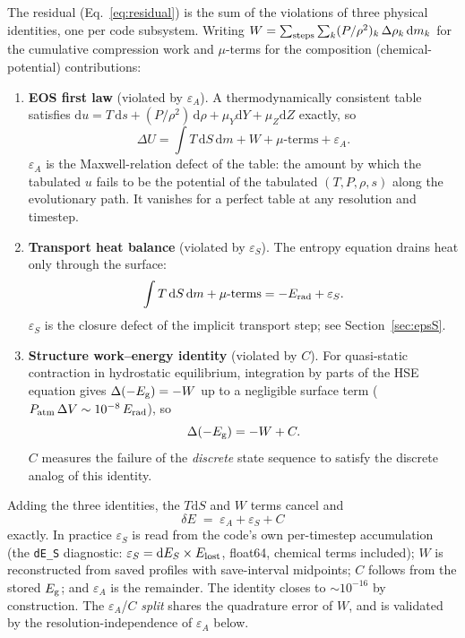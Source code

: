\documentclass{aastex631}
\newcommand{\dd}{\mathrm{d}}
\newcommand{\Erad}{E_{\rm rad}}
\newcommand{\Eg}{E_{\rm g}}
\newcommand{\Elost}{E_{\rm lost}}
\newcommand{\epsA}{\varepsilon_A}
\newcommand{\epsS}{\varepsilon_S}
\newcommand{\dE}{\delta E}
\begin{document}
The residual (Eq.~\ref{eq:residual}) is the sum of the violations of
three physical identities, one per code subsystem.  Writing
$W = \sum_{\rm steps}\sum_k (P/\rho^2)_k\,\Delta\rho_k\,\dd m_k$ for the
cumulative compression work and $\mu$-terms for the composition
(chemical-potential) contributions:

\begin{enumerate}
\item \textbf{EOS first law} (violated by $\epsA$).  A thermodynamically
consistent table satisfies
$\dd u = T\,\dd s + (P/\rho^2)\,\dd\rho + \mu_Y \dd Y + \mu_Z \dd Z$
exactly, so
\begin{equation}
\Delta U = \!\int\!\! T\,\dd S\,\dd m + W + \mu\text{-terms} + \epsA .
\end{equation}
$\epsA$ is the Maxwell-relation defect of the table: the amount by which
the tabulated $u$ fails to be the potential of the tabulated $(T, P,
\rho, s)$ along the evolutionary path.  It vanishes for a perfect table
at any resolution and timestep.

\item \textbf{Transport heat balance} (violated by $\epsS$).  The entropy
equation drains heat only through the surface:
\begin{equation}
\int T\,\dd S\,\dd m + \mu\text{-terms} = -\Erad + \epsS .
\end{equation}
$\epsS$ is the closure defect of the implicit transport step; see
Section~\ref{sec:epsS}.

\item \textbf{Structure work--energy identity} (violated by $C$).  For
quasi-static contraction in hydrostatic equilibrium, integration by parts
of the HSE equation gives $\Delta(-\Eg) = -W$ up to a negligible surface
term ($P_{\rm atm}\,\Delta V \sim 10^{-8}\,\Erad$), so
\begin{equation}
\Delta(-\Eg) = -W + C .
\end{equation}
$C$ measures the failure of the \emph{discrete} state sequence to satisfy
the discrete analog of this identity.
\end{enumerate}

Adding the three identities, the $T\dd S$ and $W$ terms cancel and
\begin{equation}
\boxed{\;\dE \;=\; \epsA + \epsS + C\;}
\label{eq:budget}
\end{equation}
exactly.  In practice $\epsS$ is read from the code's own per-timestep
accumulation (the \texttt{dE\_S} diagnostic:
$\epsS = \mathrm{d}E_S \times \Elost$, float64, chemical terms included);
$W$ is reconstructed from saved profiles with save-interval midpoints;
$C$ follows from the stored $\Eg$; and $\epsA$ is the remainder.  The
identity closes to $\sim$$10^{-16}$ by construction.  The $\epsA$/$C$
\emph{split} shares the quadrature error of $W$, and is validated by the
resolution-independence of $\epsA$ below.
\end{document}
